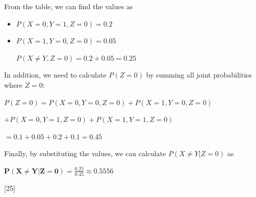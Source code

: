 \documentclass[12pt,letterpaper, onecolumn]{exam}
\begin{document}
\begin{questions}
\begin{parts}
\begin{subparts}
\begin{solution}
                From the table, we can find the values as

                \begin{itemize}
                    \item $P(X=0, Y=1, Z=0) = 0.2$
                    \item $P(X=1, Y=0, Z=0) = 0.05$
                    
                \begin{center}
                    $\displaystyle{P(X \neq Y, Z = 0) = 0.2 + 0.05 = 0.25}$
                \end{center}
                \end{itemize}

                In addition, we need to calculate $P(Z=0)$ by summing all joint probabilities where $Z=0$:

                \begin{center}
                    $\displaystyle{P(Z=0) = P(X=0, Y=0, Z=0) + P(X=1, Y=0, Z=0)}$

                    $\displaystyle{+ P(X=0, Y=1, Z=0) + P(X=1, Y=1, Z=0)}$

                    $\displaystyle{= 0.1 + 0.05 + 0.2 + 0.1 = 0.45}$
                \end{center}

                Finally, by substituting the values, we can calculate $P(X \neq Y | Z = 0)$ as

                \begin{center}
                    $\boldsymbol{\displaystyle{P(X \neq Y | Z = 0) = \frac{0.25}{0.45} \approx 0.5556}}$
                \end{center}
                
                
            \end{solution}
            
        \end{subparts}
  
    \end{parts}

    \pagebreak

    [25]


\end{questions}
\end{document}

